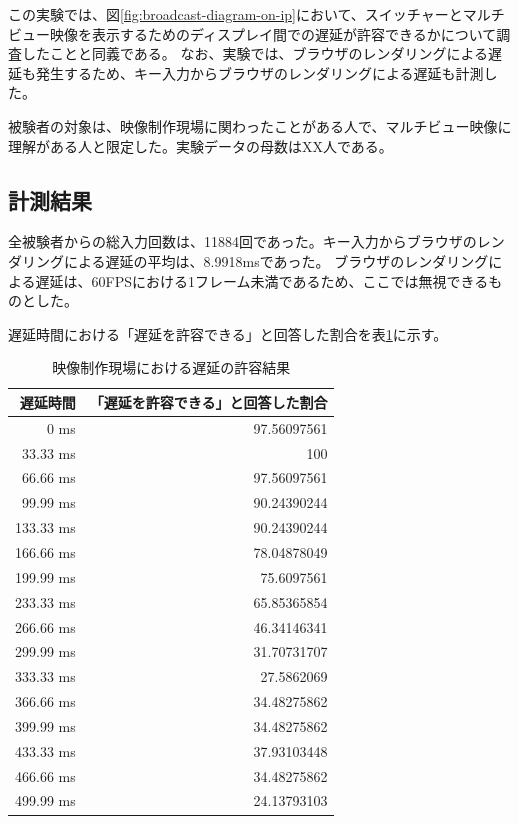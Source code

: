 この実験では、図\ref{fig:broadcast-diagram-on-ip}において、スイッチャーとマルチビュー映像を表示するためのディスプレイ間での遅延が許容できるかについて調査したことと同義である。
なお、実験では、ブラウザのレンダリングによる遅延も発生するため、キー入力からブラウザのレンダリングによる遅延も計測した。

被験者の対象は、映像制作現場に関わったことがある人で、マルチビュー映像に理解がある人と限定した。実験データの母数はXX人である。

\newpage
\subsection{計測結果}

全被験者からの総入力回数は、11884回であった。キー入力からブラウザのレンダリングによる遅延の平均は、8.9918msであった。
ブラウザのレンダリングによる遅延は、60FPSにおける1フレーム未満であるため、ここでは無視できるものとした。

遅延時間における「遅延を許容できる」と回答した割合を表\ref{tb:mv-delay-result}に示す。

\begin{table}[htbp]
  \caption{映像制作現場における遅延の許容結果}
  \label{tb:mv-delay-result}
  \begin{center}
  \begin{tabular}{r|r}
    \hline
    遅延時間   & 「遅延を許容できる」と回答した割合 \\\hline\hline
    0 ms      & 97.56097561 \\\hline
    33.33 ms  & 100         \\\hline
    66.66 ms  & 97.56097561 \\\hline
    99.99 ms  & 90.24390244 \\\hline
    133.33 ms & 90.24390244 \\\hline
    166.66 ms & 78.04878049 \\\hline
    199.99 ms & 75.6097561  \\\hline
    233.33 ms & 65.85365854 \\\hline
    266.66 ms & 46.34146341 \\\hline
    299.99 ms & 31.70731707 \\\hline
    333.33 ms & 27.5862069  \\\hline
    366.66 ms & 34.48275862 \\\hline
    399.99 ms & 34.48275862 \\\hline
    433.33 ms & 37.93103448 \\\hline
    466.66 ms & 34.48275862 \\\hline
    499.99 ms & 24.13793103 \\\hline
  \end{tabular}\end{center}
\end{table}

